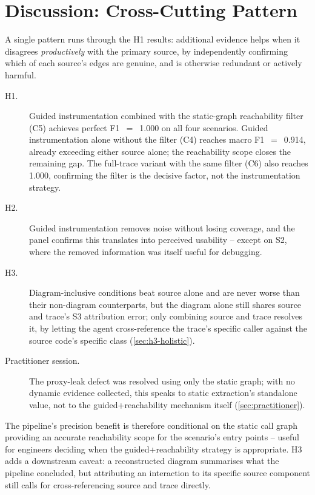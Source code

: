 \section{Discussion: Cross-Cutting Pattern}\label{sec:discussion}

A single pattern runs through the H1 results: additional evidence helps
when it disagrees \emph{productively} with the primary source, by
independently confirming which of each source's edges are genuine, and
is otherwise redundant or actively harmful.

\begin{description}
  \item[H1.] Guided instrumentation combined with the static-graph
    reachability filter (C5) achieves perfect F1~$=$~1.000 on all four
    scenarios. Guided instrumentation alone without the filter (C4)
    reaches macro F1~$=$~0.914, already exceeding either source alone;
    the reachability scope closes the remaining gap. The full-trace
    variant with the same filter (C6) also reaches 1.000, confirming
    the filter is the decisive factor, not the instrumentation
    strategy.
  \item[H2.] Guided instrumentation removes noise without losing
    coverage, and the panel confirms this translates into perceived
    usability -- except on S2, where the removed information was itself
    useful for debugging.
  \item[H3.] Diagram-inclusive conditions beat source alone and are
    never worse than their non-diagram counterparts, but the diagram
    alone still shares source and trace's S3 attribution error; only
    combining source and trace resolves it, by letting the agent
    cross-reference the trace's specific caller against the source
    code's specific class (\cref{sec:h3-holistic}).
  \item[Practitioner session.] The proxy-leak defect was resolved using
    only the static graph; with no dynamic evidence collected, this
    speaks to static extraction's standalone value, not to the
    guided+reachability mechanism itself (\cref{sec:practitioner}).
\end{description}

The pipeline's precision benefit is therefore conditional on the static
call graph providing an accurate reachability scope for the scenario's
entry points -- useful for engineers deciding when the guided+reachability
strategy is appropriate. H3 adds a downstream caveat: a reconstructed
diagram summarises what the pipeline concluded, but attributing an
interaction to its specific source component still calls for
cross-referencing source and trace directly.

